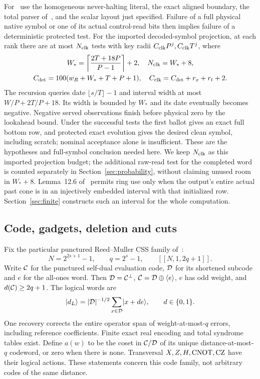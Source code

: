 For~\cite[Lemma~12.5]{DMMemory2026} use the homogeneous never-halting literal, the exact aligned boundary, the total parser of~\cite[Lemma~12.4]{DMMemory2026}, and the scalar layout just specified. Failure of a full physical native symbol or one of its actual control-read bits then implies failure of a deterministic protected test. For the imported decoded-symbol projection, at each rank there are at most $N_{\rm clk}$ tests with key radii $C_{\rm clk}P^j,C_{\rm clk}T^j$, where
\begin{equation}\label{eq:clockconstants}
\begin{gathered}
 W_* =\left\lceil\frac{2T+18P}{P-1}\right\rceil+2,\quad
 N_{\rm clk}=W_*+8,\\
 C_{\rm det}=100(w_R+W_*+T+P+1),\quad
 C_{\rm clk}=C_{\rm det}+r_x+r_t+2.
\end{gathered}
\end{equation}
The recursion queries date $\lfloor s/T\rfloor-1$ and interval width at most $W/P+2T/P+18$. Its width is bounded by $W_*$ and its date eventually becomes negative. Negative served observations finish before physical zero by the lookahead bound. Under the successful tests the first ballot gives an exact full bottom row, and protected exact evolution gives the desired clean symbol, including scratch; nominal acceptance alone is insufficient. These are the hypotheses and full-symbol conclusion needed here. We keep $N_{\rm clk}$ as this imported projection budget; the additional raw-read test for the completed word is counted separately in Section~\ref{sec:probability}, without claiming unused room in $W_*+8$. Lemma~12.6 of~\cite{DMMemory2026} permits ring use only when the output's entire actual past cone is in an injectively embedded interval with that initialized row. Section~\ref{sec:finite} constructs such an interval for the whole computation.

\subsection{Code, gadgets, deletion and cuts}\label{sec:code}
Fix the particular punctured Reed--Muller CSS family of~\cite[Lemma~5.1]{DMMemory2026}:
\begin{equation}\label{eq:code}
 N=2^{2s+1}-1,\qquad q=2^s-1,\qquad [[N,1,2q+1]].
\end{equation}
Write $\mathcal C$ for the punctured self-dual evaluation code, $\mathcal D$ for its shortened subcode and $e$ for the all-ones word. Then $\mathcal D=\mathcal C^\perp$, $\mathcal C=\mathcal D\oplus\langle e\rangle$, $e$ has odd weight, and $d(\mathcal C)\ge2q+1$. The logical words are
\[
 \lvert d_L\rangle=|\mathcal D|^{-1/2}\sum_{x\in\mathcal D}\lvert x+de\rangle,
 \qquad d\in\{0,1\}.
\]
One recovery corrects the entire operator span of weight-at-most-$q$ errors, including reference coefficients. Finite exact real encoding and total syndrome tables exist. Define $a(w)$ to be the coset in $\mathcal C/\mathcal D$ of its unique distance-at-most-$q$ codeword, or zero when there is none. Transversal $X,Z,H,\operatorname{CNOT},\operatorname{CZ}$ have their logical actions. These statements concern this code family, not arbitrary codes of the same distance.

